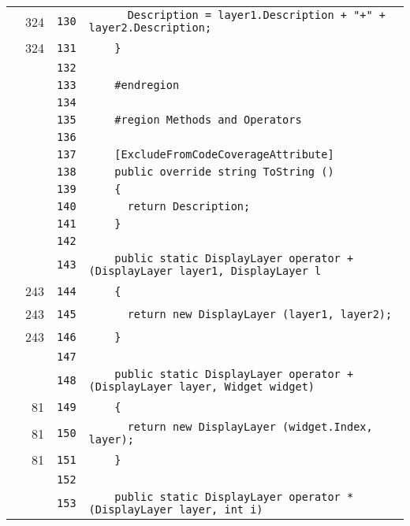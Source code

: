 \documentclass[a4paper,10pt]{article}
\begin{document}
\begin{longtable}[l]{lrrl}
\cellcolor{green} & 324 & \verb~130~ & \verb~      Description = layer1.Description + "+" + layer2.Description;~\\
\cellcolor{green} & 324 & \verb~131~ & \verb~    }~\\
\cellcolor{gray} &  & \verb~132~ & \verb~~\\
\cellcolor{gray} &  & \verb~133~ & \verb~    #endregion~\\
\cellcolor{gray} &  & \verb~134~ & \verb~~\\
\cellcolor{gray} &  & \verb~135~ & \verb~    #region Methods and Operators~\\
\cellcolor{gray} &  & \verb~136~ & \verb~~\\
\cellcolor{gray} &  & \verb~137~ & \verb~    [ExcludeFromCodeCoverageAttribute]~\\
\cellcolor{gray} &  & \verb~138~ & \verb~    public override string ToString ()~\\
\cellcolor{gray} &  & \verb~139~ & \verb~    {~\\
\cellcolor{gray} &  & \verb~140~ & \verb~      return Description;~\\
\cellcolor{gray} &  & \verb~141~ & \verb~    }~\\
\cellcolor{gray} &  & \verb~142~ & \verb~~\\
\cellcolor{gray} &  & \verb~143~ & \verb~    public static DisplayLayer operator + (DisplayLayer layer1, DisplayLayer l~\\
\cellcolor{green} & 243 & \verb~144~ & \verb~    {~\\
\cellcolor{green} & 243 & \verb~145~ & \verb~      return new DisplayLayer (layer1, layer2);~\\
\cellcolor{green} & 243 & \verb~146~ & \verb~    }~\\
\cellcolor{gray} &  & \verb~147~ & \verb~~\\
\cellcolor{gray} &  & \verb~148~ & \verb~    public static DisplayLayer operator + (DisplayLayer layer, Widget widget)~\\
\cellcolor{green} & 81 & \verb~149~ & \verb~    {~\\
\cellcolor{green} & 81 & \verb~150~ & \verb~      return new DisplayLayer (widget.Index, layer);~\\
\cellcolor{green} & 81 & \verb~151~ & \verb~    }~\\
\cellcolor{gray} &  & \verb~152~ & \verb~~\\
\cellcolor{gray} &  & \verb~153~ & \verb~    public static DisplayLayer operator * (DisplayLayer layer, int i)~\\

\end{longtable}
\end{document}
